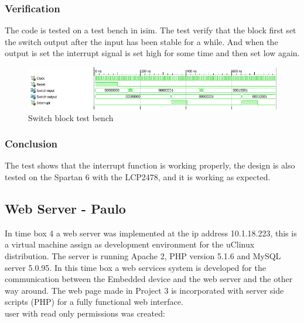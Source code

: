 \subsubsection{Verification}
%
The code is tested on a test bench in isim. The test verify that the block first set the switch output after the input has been stable for a while. And when the output is set the interrupt signal is set high for some time and then set low again. 
\begin{figure}[H]
	\begin{centering}
		\includegraphics[width=1.0\textwidth]{images/tb6_switch_tb.png}
		\caption{Switch block test bench}
	\end{centering}
\end{figure}
\subsubsection{Conclusion}
The test shows that the interrupt function is working properly, the design is also tested on the Spartan 6 with the LCP2478, and it is working as expected.
\subsection{Web Server - Paulo}
%
In time box 4 a web server was implemented at the ip address 10.1.18.223, this is a virtual machine assign as development environment for the uClinux distribution. The server is running Apache 2, PHP version 5.1.6 and MySQL server 5.0.95.
In this time box a web services system is developed for the communication between the Embedded device and the web server and the other way around. The web page made in Project 3 is incorporated with server side scripts (PHP) for a fully functional web interface.\\
\A user with read only permissions was created:

